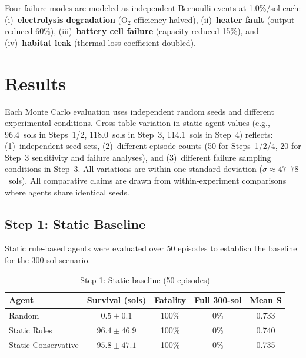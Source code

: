 \documentclass[11pt,a4paper]{article}
\begin{document}
Four failure modes are modeled as independent Bernoulli events at 1.0\%/sol each: (i)~\textbf{electrolysis degradation} (O$_2$ efficiency halved), (ii)~\textbf{heater fault} (output reduced 60\%), (iii)~\textbf{battery cell failure} (capacity reduced 15\%), and (iv)~\textbf{habitat leak} (thermal loss coefficient doubled).

\section{Results}

Each Monte Carlo evaluation uses independent random seeds and different experimental conditions. Cross-table variation in static-agent values (e.g., 96.4~sols in Steps~1/2, 118.0~sols in Step~3, 114.1~sols in Step~4) reflects: (1)~independent seed sets, (2)~different episode counts (50 for Steps~1/2/4, 20 for Step~3 sensitivity and failure analyses), and (3)~different failure sampling conditions in Step~3. All variations are within one standard deviation ($\sigma \approx 47$--$78$~sols). All comparative claims are drawn from within-experiment comparisons where agents share identical seeds.

\subsection{Step 1: Static Baseline}

Static rule-based agents were evaluated over 50 episodes to establish the baseline for the 300-sol scenario.

\begin{table}[H]
  \centering
  \caption{Step 1: Static baseline (50 episodes)}
  \label{tab:step1}
  \begin{tabular}{@{}lcccc@{}}
    \toprule
    \textbf{Agent} & \textbf{Survival (sols)} & \textbf{Fatality} & \textbf{Full 300-sol} & \textbf{Mean S} \\
    \midrule
    Random & $0.5 \pm 0.1$ & 100\% & 0\% & 0.733 \\
    Static Rules & $96.4 \pm 46.9$ & 100\% & 0\% & 0.740 \\
    Static Conservative & $95.8 \pm 47.1$ & 100\% & 0\% & 0.735 \\
    \bottomrule
  \end{tabular}
\end{table}
\end{document}
